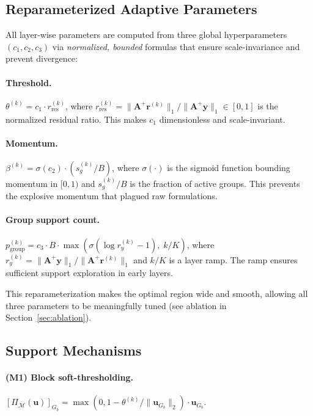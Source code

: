 \documentclass{article}
\begin{document}
\subsection{Reparameterized Adaptive Parameters}

All layer-wise parameters are computed from three global hyperparameters $(c_1, c_2, c_3)$ via \emph{normalized, bounded} formulas that ensure scale-invariance and prevent divergence:

\paragraph{Threshold.}
$\theta^{(k)} = c_1 \cdot r^{(k)}_{\text{res}}$,
where $r^{(k)}_{\text{res}} = \|\mathbf{A}^+\mathbf{r}^{(k)}\|_1 / \|\mathbf{A}^+\mathbf{y}\|_1 \in [0,1]$ is the normalized residual ratio. This makes $c_1$ dimensionless and scale-invariant.

\paragraph{Momentum.}
$\beta^{(k)} = \sigma(c_2) \cdot (s^{(k)}_g / B)$,
where $\sigma(\cdot)$ is the sigmoid function bounding momentum in $[0,1)$ and $s^{(k)}_g/B$ is the fraction of active groups. This prevents the explosive momentum that plagued raw formulations.

\paragraph{Group support count.}
$p^{(k)}_{\text{group}} = c_3 \cdot B \cdot \max\!\left(\sigma(\log r_y^{(k)} - 1),\; k/K\right)$,
where $r_y^{(k)} = \|\mathbf{A}^+\mathbf{y}\|_1 / \|\mathbf{A}^+\mathbf{r}^{(k)}\|_1$ and $k/K$ is a layer ramp. The ramp ensures sufficient support exploration in early layers.

This reparameterization makes the optimal region wide and smooth, allowing all three parameters to be meaningfully tuned (see ablation in Section~\ref{sec:ablation}).

\subsection{Support Mechanisms}

\paragraph{(M1) Block soft-thresholding.}
$[\Pi_{\mathcal{M}}(\mathbf{u})]_{G_b} = \max(0, 1 - \theta^{(k)}/\|\mathbf{u}_{G_b}\|_2) \cdot \mathbf{u}_{G_b}$.
\end{document}
